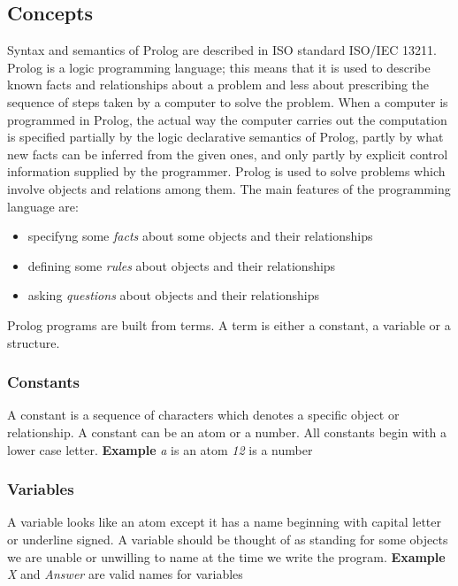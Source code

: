 \subsection{Concepts}\label{subsec:concepts}
Syntax and semantics of Prolog are described in ISO standard ISO/IEC 13211. Prolog is a logic programming language; 
this means that it is used to describe known facts and relationships about a problem and less about prescribing
the sequence of steps taken by a computer to solve the problem.
When a computer is programmed in Prolog, the actual way the computer carries out the computation is specified
partially by the logic declarative semantics of Prolog, partly by what new facts can be inferred from the given ones,
and only partly by explicit control information supplied by the programmer.
\newline\newline
Prolog is used to solve problems which involve objects and relations among them.
The main features of the programming language are:
\begin{itemize}
    \item specifyng some \textit{facts} about some objects and their relationships
    \item defining some \textit{rules} about objects and their relationships
    \item asking \textit{questions} about objects and their relationships
\end{itemize}

Prolog programs are built from terms. A term is either a constant, a variable or a structure.
\subsubsection{Constants}\label{subsubsec:constants}
A constant is a sequence of characters which denotes a specific object or relationship. A constant can be an atom or a number.
All constants begin with a lower case letter.\newline\newline
\textbf{Example}\newline\newline
\textit{a} is an atom\newline
\textit{12} is a number

\subsubsection{Variables}\label{subsubsec:variables}
A variable looks like an atom except it has a name beginning with capital letter or underline signed.
A variable should be thought of as standing for some objects we are unable or unwilling to name at the time we write the program.\newline\newline
\textbf{Example}\newline\newline
\textit{X} and \textit{Answer} are valid names for variables

